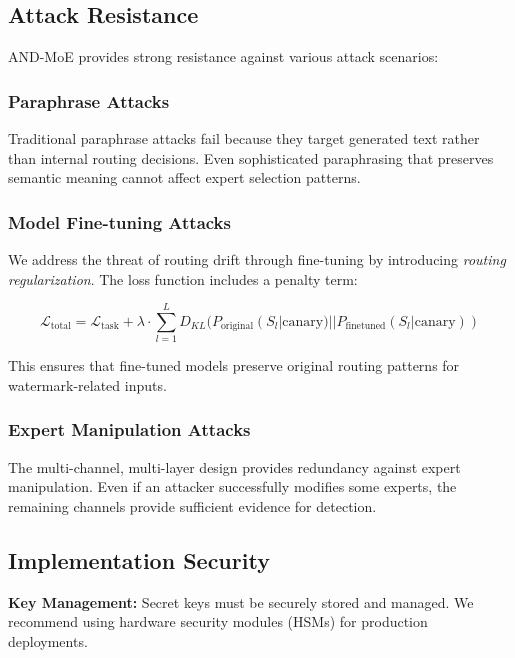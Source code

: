 \documentclass[letterpaper,twocolumn,10pt]{article}
\begin{document}
\subsection{Attack Resistance}

AND-MoE provides strong resistance against various attack scenarios:

\subsubsection{Paraphrase Attacks}

Traditional paraphrase attacks fail because they target generated text rather than internal routing decisions. Even sophisticated paraphrasing that preserves semantic meaning cannot affect expert selection patterns.

\subsubsection{Model Fine-tuning Attacks}

We address the threat of routing drift through fine-tuning by introducing \textit{routing regularization}. The loss function includes a penalty term:

\begin{equation}
\mathcal{L}_{\text{total}} = \mathcal{L}_{\text{task}} + \lambda \cdot \sum_{l=1}^{L} D_{KL}(P_{\text{original}}(S_l|\text{canary}) || P_{\text{finetuned}}(S_l|\text{canary}))
\end{equation}

This ensures that fine-tuned models preserve original routing patterns for watermark-related inputs.

\subsubsection{Expert Manipulation Attacks}

The multi-channel, multi-layer design provides redundancy against expert manipulation. Even if an attacker successfully modifies some experts, the remaining channels provide sufficient evidence for detection.

\subsection{Implementation Security}

\textbf{Key Management:} Secret keys must be securely stored and managed. We recommend using hardware security modules (HSMs) for production deployments.
\end{document}
